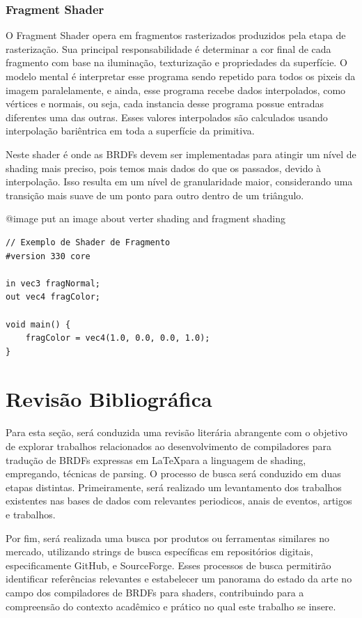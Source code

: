 \documentclass[english, 
               brazil, 
               bsc] %
               {dcomp-abntex2}
\begin{document}
\subsection{Fragment Shader}

O Fragment Shader opera em fragmentos rasterizados produzidos pela etapa de rasterização. Sua principal responsabilidade é determinar a cor final de cada fragmento com base na iluminação, texturização e propriedades da superfície. O modelo mental é interpretar esse programa  sendo repetido para todos os pixeis da imagem paralelamente, e ainda, esse programa recebe dados interpolados, como vértices e normais, ou seja, cada instancia desse programa possue entradas diferentes uma das outras. Esses valores interpolados são calculados usando interpolação bariêntrica em toda a superfície da primitiva.

Neste shader é onde as BRDFs devem ser implementadas para atingir um nível de shading mais preciso, pois temos mais dados do que os passados, devido à interpolação. Isso resulta em um nível de granularidade maior, considerando uma transição mais suave de um ponto para outro dentro de um triângulo.

@image{ put an image about verter shading and fragment shading}

\begin{verbatim}
// Exemplo de Shader de Fragmento
#version 330 core

in vec3 fragNormal;
out vec4 fragColor;

void main() {
    fragColor = vec4(1.0, 0.0, 0.0, 1.0); 
}
\end{verbatim}

\chapter{Revisão Bibliográfica} \label{revisao}

Para esta seção, será conduzida uma revisão literária abrangente com o objetivo de explorar trabalhos relacionados ao desenvolvimento de compiladores para tradução de BRDFs expressas em \LaTeX  para a linguagem de shading, empregando, técnicas de parsing. O processo de busca será conduzido em duas etapas distintas. Primeiramente, será realizado um levantamento dos trabalhos existentes nas bases de dados  com relevantes periodicos, anais de eventos, artigos e trabalhos. 


Por fim, será realizada uma busca por produtos ou ferramentas similares no mercado, utilizando strings de busca específicas em repositórios digitais, especificamente GitHub, e SourceForge. Esses processos de busca permitirão identificar referências relevantes e estabelecer um panorama do estado da arte no campo dos compiladores de BRDFs  para shaders, contribuindo para a compreensão do contexto acadêmico e prático no qual este trabalho se insere.
\end{document}
